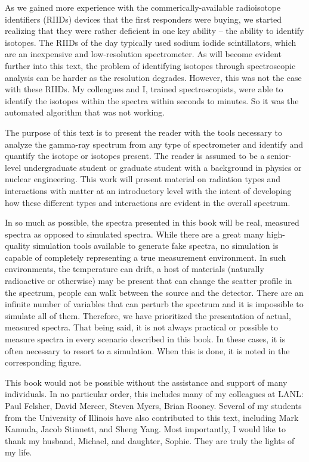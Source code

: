As we gained more experience with the commerically-available radioisotope identifiers (RIIDs) devices that the first responders were buying, we started realizing that they were rather deficient in one key ability -- the ability to identify isotopes.  The RIIDs of the day typically used sodium iodide scintillators, which are an inexpensive and low-resolution spectrometer.  As will become evident further into this text, the problem of identifying isotopes through spectroscopic analysis can be harder as the resolution degrades.  However, this was not the case with these RIIDs.  My colleagues and I, trained spectroscopists, were able to identify the isotopes within the spectra within seconds to minutes.  So it was the automated algorithm that was not working.

The purpose of this text is to present the reader with the tools necessary to analyze the gamma-ray spectrum from any type of spectrometer and identify and quantify the isotope or isotopes present.  The reader is assumed to be a senior-level undergraduate student or graduate student with a background in  physics or nuclear engineering.  This work will present material on radiation types and interactions with matter at an introductory level with the intent of developing how these different types and interactions are evident in the overall spectrum.  

In so much as possible, the spectra presented in this book will be real, measured spectra as opposed to simulated spectra.  While there are a great many high-quality simulation tools available to generate fake spectra, no simulation is capable of completely representing a true measurement environment.  In such environments, the temperature can drift, a host of materials (naturally radioactive or otherwise) may be present that can change the scatter profile in the spectrum, people can walk between the source and the detector.  There are an infinite number of variables that can perturb the spectrum and it is impossible to simulate all of them.  Therefore, we have prioritized the presentation of actual, measured spectra.  That being said, it is not always practical or possible to measure spectra in every scenario described in this book.  In these cases, it is often necessary to resort to a simulation.  When this is done, it is noted in the corresponding figure.

This book would not be possible without the assistance and support of many individuals.  In no particular order, this includes many of my colleagues at LANL: Paul Felsher, David Mercer, Steven Myers, Brian Rooney.  Several of my students from the University of Illinois have also contributed to this text, including Mark Kamuda, Jacob Stinnett, and Sheng Yang.  Most importantly, I would like to thank my husband, Michael, and daughter, Sophie.  They are truly the lights of my life.